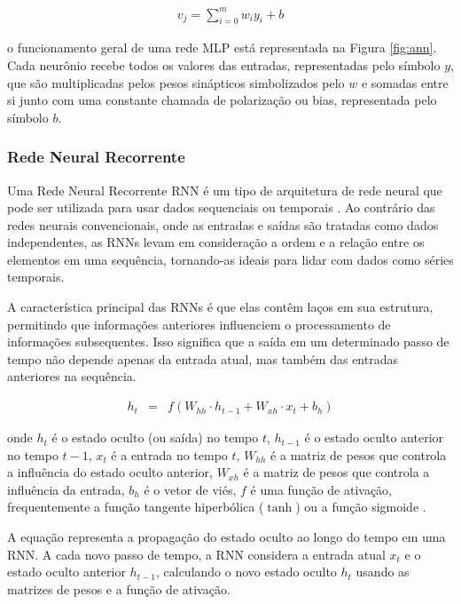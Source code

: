  \begin{eqnarray}
 	v_j=\sum_{i=0}^m w_i y_i+b\label{eq:ann}
 \end{eqnarray}
 
 \noindent o funcionamento geral de uma rede MLP está representada na Figura \ref{fig:ann}. Cada neurônio recebe todos os valores das entradas, representadas pelo símbolo $y$, que são multiplicadas pelos pesos sinápticos simbolizados pelo $w$ e somadas entre si junto com uma constante chamada de polarização ou bias, representada pelo símbolo $b$.
 
  \subsubsection{Rede Neural Recorrente}
  
 Uma Rede Neural Recorrente RNN é um tipo de arquitetura de rede neural que pode ser utilizada para usar dados sequenciais ou temporais \cite{NASIRI2023110867}. Ao contrário das redes neurais convencionais, onde as entradas e saídas são tratadas como dados independentes, as RNNs levam em consideração a ordem e a relação entre os elementos em uma sequência, tornando-as ideais para lidar com dados como séries temporais.
 
 A característica principal das RNNs é que elas contêm laços em sua estrutura, permitindo que informações anteriores influenciem o processamento de informações subsequentes. Isso significa que a saída em um determinado passo de tempo não depende apenas da entrada atual, mas também das entradas anteriores na sequência.
  
 \begin{eqnarray}
 	h_t &=& f(W_{hh} \cdot h_{t-1} + W_{xh} \cdot x_t + b_h)\label{eq:rnn}
 \end{eqnarray}
 
 \noindent onde \( h_t \) é o estado oculto (ou saída) no tempo \( t \), \( h_{t-1} \) é o estado oculto anterior no tempo \( t-1 \), \( x_t \) é a entrada no tempo \( t \), \( W_{hh} \) é a matriz de pesos que controla a influência do estado oculto anterior, \( W_{xh} \) é a matriz de pesos que controla a influência da entrada, \( b_h \) é o vetor de viés, \( f \) é uma função de ativação, frequentemente a função tangente hiperbólica ($\operatorname{tanh}$) ou a função sigmoide \cite{lstm}.
 
 A equação representa a propagação do estado oculto ao longo do tempo em uma RNN. A cada novo passo de tempo, a RNN considera a entrada atual \( x_t \) e o estado oculto anterior \( h_{t-1} \), calculando o novo estado oculto \( h_t \) usando as matrizes de pesos e a função de ativação. 
 
